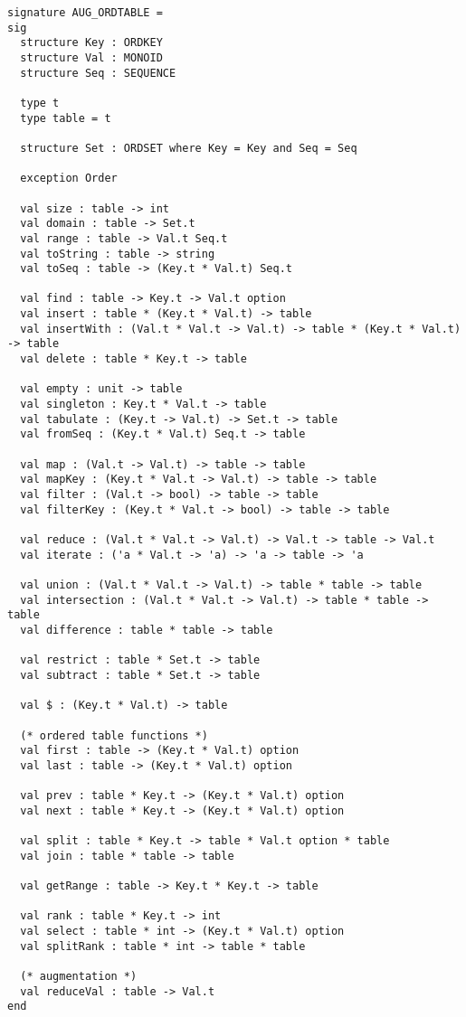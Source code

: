 \begin{gram}
\begin{verbatim}
signature AUG_ORDTABLE =
sig
  structure Key : ORDKEY
  structure Val : MONOID
  structure Seq : SEQUENCE

  type t
  type table = t

  structure Set : ORDSET where Key = Key and Seq = Seq

  exception Order

  val size : table -> int
  val domain : table -> Set.t
  val range : table -> Val.t Seq.t
  val toString : table -> string
  val toSeq : table -> (Key.t * Val.t) Seq.t

  val find : table -> Key.t -> Val.t option
  val insert : table * (Key.t * Val.t) -> table
  val insertWith : (Val.t * Val.t -> Val.t) -> table * (Key.t * Val.t) -> table
  val delete : table * Key.t -> table

  val empty : unit -> table
  val singleton : Key.t * Val.t -> table
  val tabulate : (Key.t -> Val.t) -> Set.t -> table
  val fromSeq : (Key.t * Val.t) Seq.t -> table

  val map : (Val.t -> Val.t) -> table -> table
  val mapKey : (Key.t * Val.t -> Val.t) -> table -> table
  val filter : (Val.t -> bool) -> table -> table
  val filterKey : (Key.t * Val.t -> bool) -> table -> table

  val reduce : (Val.t * Val.t -> Val.t) -> Val.t -> table -> Val.t
  val iterate : ('a * Val.t -> 'a) -> 'a -> table -> 'a

  val union : (Val.t * Val.t -> Val.t) -> table * table -> table
  val intersection : (Val.t * Val.t -> Val.t) -> table * table -> table
  val difference : table * table -> table

  val restrict : table * Set.t -> table
  val subtract : table * Set.t -> table

  val $ : (Key.t * Val.t) -> table

  (* ordered table functions *)
  val first : table -> (Key.t * Val.t) option
  val last : table -> (Key.t * Val.t) option

  val prev : table * Key.t -> (Key.t * Val.t) option
  val next : table * Key.t -> (Key.t * Val.t) option

  val split : table * Key.t -> table * Val.t option * table
  val join : table * table -> table

  val getRange : table -> Key.t * Key.t -> table

  val rank : table * Key.t -> int
  val select : table * int -> (Key.t * Val.t) option
  val splitRank : table * int -> table * table

  (* augmentation *)
  val reduceVal : table -> Val.t
end
\end{verbatim}
\end{gram}

